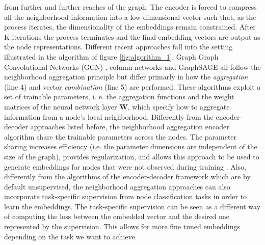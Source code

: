 from further and further reaches of the graph. The encoder is forced to compress all the neighborhood information into a low dimensional vector such that, as the process iterates, the dimensionality of the embeddings remain constrained. After K iterations the process terminates and the final embedding vectors are output as the node representations. Different recent approaches fall into the setting illustrated in the algorithm of figure \ref{fig:algorithm_1}. Graph Graph Convolutional Networks (GCN) \cite{kipf_semi_supervised}, column networks \cite{column_networks} and GraphSAGE \cite{graphSAGE} all follow the neighborhood aggregation principle but differ primarly in how the \textit{aggregation} (line 4) and vector \textit{combination} (line 5) are performed. These algorithms exploit a set of trainable parameters, i. e. the aggregation functions and the weight matrices of the neural network layer \textbf{W}, which specify how to aggregate information from a node's local neighborhood. Differently from the encoder-decoder approaches listed before, the neighborhood aggregation encoder algorithm share the trainable parameters across the nodes. The parameter sharing increases efficiency (i.e. the parameter dimensions are independent of the size of the graph), provides regularization, and allows this approach to be used to generate embeddings for nodes that were not observed during training \cite{graphSAGE}. Also, differently from the algorithms of the encoder-decoder framework which are by default unsupervised, the neighborhood aggregation approaches can also incorporate task-specific supervision from node classification tasks in order to learn the embeddings. The task-specific supervision can be seen as a different way of computing the loss between the embedded vector and the desired one represented by the supervision. This allows for more fine tuned embeddings depending on the task we want to achieve. 

